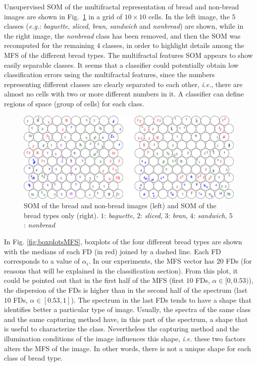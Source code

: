 Unsupervised SOM of the multifractal representation of bread and non-bread images are shown in Fig.~\ref{fig:somfractal} in a grid of $10\times10$ cells. In the left image, the $5$ classes ({\em e.g.}: {\em baguette}, {\em sliced}, {\em bran}, {\em sandwich} and {\em nonbread}) are shown, while in the right image, the {\em nonbread} class has been removed, and then the SOM was recomputed for the remaining $4$ classes, in order to highlight details among the MFS of the different bread types. The multifractal features SOM appears to show easily separable classes. It seems that a classifier could potentially obtain low classification errors using the multifractal features, since the numbers representing different classes are clearly separated to each other, {\em i.e.}, there are almost no cells with two or more different numbers in it. A classifier can define regions of space (group of cells) for each class.
\begin{figure}
\begin{centering}
\includegraphics[scale=0.4]{../images/Fig4}
\caption{SOM of the bread and non-bread images (left) and SOM of the bread types only (right). $1$: {\em baguette}, $2$: {\em sliced}, $3$: {\em bran}, $4$: {\em sandwich}, $5$: {\em nonbread} }
\label{fig:somfractal}
\end{centering}
\end{figure}

In Fig. \ref{fig:boxplotsMFS}, boxplots of the four different bread types are shown with the medians of each FD (in red) joined by a dashed line. Each FD corresponds to a value of $\alpha_{i}$. In our experiments, the MFS vector has $20$ FDs (for reasons that will be explained in the classification section). From this plot, it could be pointed out that in the first half of the MFS (first $10$ FDs, $\alpha \in [0,0.53)$), the dispersion of the FDs is higher than in the second half of the spectrum (last $10$ FDs, $\alpha \in [0.53,1]$). The spectrum in the last FDs tends to have a shape that identifies better a particular type of image. Usually, the spectra of the same class and the same capturing method have, in this part of the spectrum, a shape that is useful to characterize the class. Nevertheless the capturing method and the illumination conditions of the image influences this shape, {\em i.e.} these two factors alters the MFS of the image. In other words, there is not a unique shape for each class of bread type.


